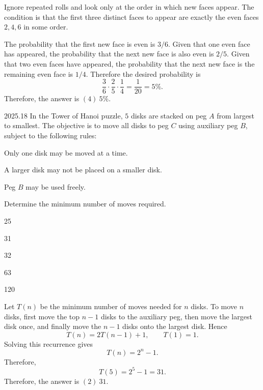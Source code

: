     \begin{solution}
        Ignore repeated rolls and look only at the order in which new faces appear. The condition is
        that the first three distinct faces to appear are exactly the even faces $2,4,6$ in some
        order.

        The probability that the first new face is even is $3/6$. Given that one even face has
        appeared, the probability that the next new face is also even is $2/5$. Given that two even
        faces have appeared, the probability that the next new face is the remaining even face is
        $1/4$. Therefore the desired probability is
        \[
            \frac36\cdot\frac25\cdot\frac14
            =
            \frac1{20}
            =
            5\%.
        \]
        Therefore, the answer is $\boxed{(4)\ 5\%}$.
    \end{solution}

    \begin{pastproblem}{2025.18}
        In the Tower of Hanoi puzzle, $5$ disks are stacked on peg $A$ from largest to smallest.
        The objective is to move all disks to peg $C$ using auxiliary peg $B$, subject to the
        following rules:
        \begin{problemchoices}
            \item Only one disk may be moved at a time.
            \item A larger disk may not be placed on a smaller disk.
            \item Peg $B$ may be used freely.
        \end{problemchoices}
        Determine the minimum number of moves required.
        \begin{problemchoices}
            \item 25
            \item 31
            \item 32
            \item 63
            \item 120
        \end{problemchoices}
    \end{pastproblem}

    \begin{solution}
        Let $T(n)$ be the minimum number of moves needed for $n$ disks. To move $n$ disks, first
        move the top $n-1$ disks to the auxiliary peg, then move the largest disk once, and finally
        move the $n-1$ disks onto the largest disk. Hence
        \[
            T(n)=2T(n-1)+1,
            \qquad
            T(1)=1.
        \]
        Solving this recurrence gives
        \[
            T(n)=2^n-1.
        \]
        Therefore,
        \[
            T(5)=2^5-1=31.
        \]
        Therefore, the answer is $\boxed{(2)\ 31}$.
    \end{solution}

